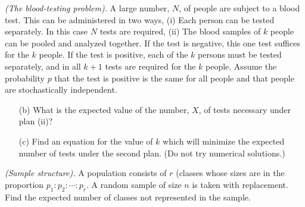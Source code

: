 \begin{problem}[Handout 6, \# 12]
  \emph{(The blood-testing problem).} A large number, \(N\), of people are
  subject to a blood test. This can be administered in two ways, (i) Each
  person can be tested separately. In this case \(N\) tests are required,
  (ii) The blood samples of \(k\) people can be pooled and analyzed
  together. If the test is negative, this one test suffices for the \(k\)
  people. If the test is positive, each of the \(k\) persons must be tested
  separately, and in all \(k+1\) tests are required for the \(k\)
  people. Assume the probability \(p\) that the test is positive is the
  same for all people and that people are stochastically independent.
  \begin{itemize}[noitemsep]
  \item[(b)] What is the expected value of the number, \(X\), of tests
    necessary under plan (ii)?
  \item[(c)] Find an equation for the value of \(k\) which will minimize
    the expected number of tests under the second plan. (Do not try
    numerical solutions.)
  \end{itemize}
\end{problem}
\begin{solution*}
\end{solution*}

\begin{problem}[Handout 6, \# 13]
  \emph{(Sample structure).} A population consists of \(r\) (classes whose
  sizes are in the proportion \(p_1:p_2:\dotsb:p_r\). A random sample of
  size \(n\) is taken with replacement. Find the expected number of classes
  not represented in the sample.
\end{problem}
\begin{solution*}
\end{solution*}

